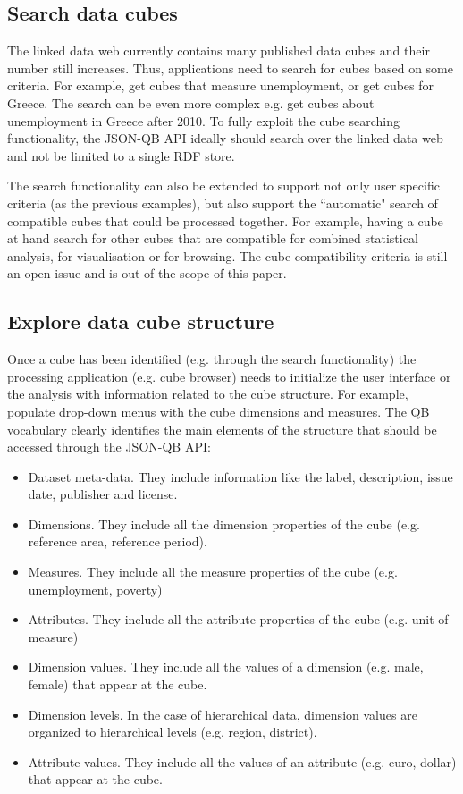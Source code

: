 \documentclass{llncs}
\begin{document}
\subsection{Search data cubes}\label{sec:search}

The linked data web currently contains many published data cubes and their number still increases. Thus, applications need to search for cubes based on some criteria. For example, get cubes that measure unemployment, or get cubes for Greece. The search can be even more complex e.g. get cubes about unemployment in Greece after 2010. To fully exploit the cube searching functionality, the JSON-QB API ideally should search over the linked data web and not be limited to a single RDF store.

The search functionality can also be extended to support not only user specific criteria (as the previous examples), but also support the ``automatic" search of compatible cubes that could be processed together. For example, having a cube at hand search for other cubes that are compatible for combined statistical analysis, for visualisation or for browsing. The cube compatibility criteria is still an open issue and is out of the scope of this paper. 

\subsection{Explore data cube structure}

Once a cube has been identified (e.g. through the search functionality) the processing application (e.g. cube browser) needs to initialize the user interface or the analysis with information related to the cube structure. For example, populate drop-down menus with the cube dimensions and measures. The QB vocabulary clearly identifies the main elements of the structure that should be accessed through the JSON-QB API:
\begin{itemize}
\item Dataset meta-data. They include information like the label, description, issue date, publisher and license.
\item Dimensions. They include all the dimension properties of the cube (e.g. reference area, reference period).
\item Measures. They include all the measure properties of the cube (e.g. unemployment, poverty)
\item Attributes. They include all the attribute properties of the cube (e.g. unit of measure)
\item Dimension values. They include all the values of a dimension (e.g. male, female) that appear at the cube. 
\item Dimension levels. In the case of hierarchical data, dimension values are organized to hierarchical levels (e.g. region, district).
\item Attribute values. They include all the values of an attribute (e.g. euro, dollar) that appear at the cube. 
\end{itemize} 
\end{document}

